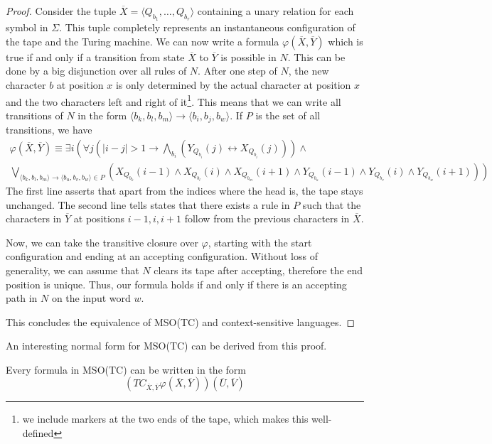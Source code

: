 \begin{proof}
    Consider the tuple $\overline{X} = \langle Q_{b_1}, \dots, Q_{b_r} \rangle$ containing a unary relation for each symbol in $\Sigma$.
    This tuple completely represents an instantaneous configuration of the tape and the Turing machine.
    We can now write a formula $\varphi(\overline{X}, \overline{Y})$ which is true if and only if a transition from state $\overline{X}$ to $\overline{Y}$ is possible in $N$.
    This can be done by a big disjunction over all rules of $N$.
    After one step of $N$, the new character $b$ at position $x$ is only determined by the actual character at position $x$ and the two characters left and right of it\footnote{we include markers at the two ends of the tape, which makes this well-defined}.
    This means that we can write all transitions of $N$ in the form $\langle b_{k},b_{l},b_{m}\rangle \to \langle b_{i}, b_{j}, b_{w} \rangle$.
    If $P$ is the set of all transitions, we have
    \begin{multline*}
        \varphi(\overline{X}, \overline{Y}) \equiv \exists i \left(\forall j \left(|i - j| > 1 \to \bigwedge_{b_i}\left(Y_{Q_{b_i}}(j) \leftrightarrow X_{Q_{b_i}}(j)\right)\right) \land \right. \\
        \left. \bigvee_{\langle b_{k},b_{l},b_{m}\rangle \to \langle b_{u}, b_{v}, b_{w} \rangle \in P} \left(X_{Q_{b_{k}}}(i - 1) \land X_{Q_{b_{l}}}(i) \land X_{Q_{b_{m}}}(i + 1) \land Y_{Q_{b_{u}}}(i - 1) \land Y_{Q_{b_{v}}}(i) \land Y_{Q_{b_{w}}}(i + 1) \right)\right)
    \end{multline*}
    The first line asserts that apart from the indices where the head is, the tape stays unchanged.
    The second line tells states that there exists a rule in $P$ such that the characters in $\overline{Y}$ at positions $i - 1, i, i + 1$ follow from the previous characters in $\overline{X}$.

    Now, we can take the transitive closure over $\varphi$, starting with the start configuration and ending at an accepting configuration.
    Without loss of generality, we can assume that $N$ clears its tape after accepting, therefore the end position is unique.
    Thus, our formula holds if and only if there is an accepting path in $N$ on the input word $w$.

    This concludes the equivalence of \acs{MSO}(\acs{TC}) and context-sensitive languages.
\end{proof}

An interesting normal form for \acs{MSO}(\acs{TC}) can be derived from this proof.
\begin{corollary}
    \label{cor:normalmso}
    Every formula in \acs{MSO}(\acs{TC}) can be written in the form
    \[
        \left( TC_{\overline{X}, \overline{Y}} \varphi(\overline{X}, \overline{Y}) \right)\left( \overline{U}, \overline{V} \right)
    \]
\end{corollary}

